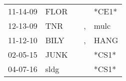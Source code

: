 \begin{supertabular}{p{0.07\textwidth}p{0.06\textwidth}p{0.02\textwidth}p{0.02\textwidth}p{0.06\textwidth}}
 11-14-09\textsuperscript{} &  FLOR\textsuperscript{} &   &    &                   *CE1* \\
 12-13-09\textsuperscript{} &   TNR\textsuperscript{} &   &  , &  mulc\textsuperscript{} \\
 11-12-10\textsuperscript{} &  BILY\textsuperscript{} &   &  , &  HANG\textsuperscript{} \\
 02-05-15\textsuperscript{} &  JUNK\textsuperscript{} &   &    &                   *CS1* \\
 04-07-16\textsuperscript{} &  sldg\textsuperscript{} &   &    &                   *CS1* \\
\end{supertabular}
